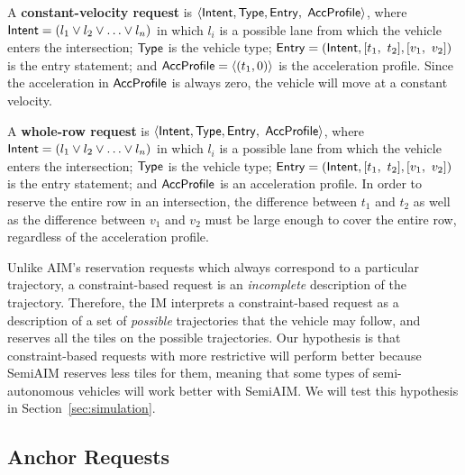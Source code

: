 \begin{small_ind_s_itemize}
\item A \textbf{constant-velocity request}
is $\langle {\sf Intent}, {\sf Type}, {\sf Entry},$ ${\sf AccProfile} \rangle$,
where
${\sf Intent} = ( l_1 \vee l_2 \vee \ldots \vee l_n )$
in which $l_i$ is a possible lane from which the vehicle 
enters the intersection;
${\sf Type}$ is the vehicle type;
${\sf Entry} = ({\sf Intent}, [t_1,\ t_2], [v_1,\ v_2])$
is the entry statement; and
${\sf AccProfile} = \langle (t_1, 0) \rangle$
is the acceleration profile.
Since the acceleration in ${\sf AccProfile}$
is always zero, the vehicle will move at a constant velocity.

\item A \textbf{whole-row request}
is $\langle {\sf Intent}, {\sf Type}, {\sf Entry},$ ${\sf AccProfile} \rangle$,
where
${\sf Intent} = ( l_1 \vee l_2 \vee \ldots \vee l_n )$
in which $l_i$ is a possible lane from which the vehicle 
enters the intersection;
${\sf Type}$ is the vehicle type;
${\sf Entry} = ({\sf Intent}, [t_1,\ t_2], [v_1,\ v_2])$
is the entry statement; and
${\sf AccProfile}$ is an acceleration profile.
In order to reserve the entire row in an intersection,
the difference between $t_1$ and $t_2$ 
as well as the difference between $v_1$ and $v_2$
must be large enough to cover the entire row,
regardless of the acceleration profile.
\end{small_ind_s_itemize}

Unlike AIM's reservation requests which always correspond to a
particular trajectory, a constraint-based request is an
\emph{incomplete} description of the trajectory.  Therefore, the IM
interprets a constraint-based request as a description of a set of
\emph{possible} trajectories that the vehicle may follow, and reserves
all the tiles on the possible trajectories. Our hypothesis is that
constraint-based requests with more restrictive will perform better
because SemiAIM reserves less tiles for them, meaning that some types
of semi-autonomous vehicles will work better with SemiAIM.  We will
test this hypothesis in Section~\ref{sec:simulation}.

\subsection{Anchor Requests}
\label{sec:anchor}

